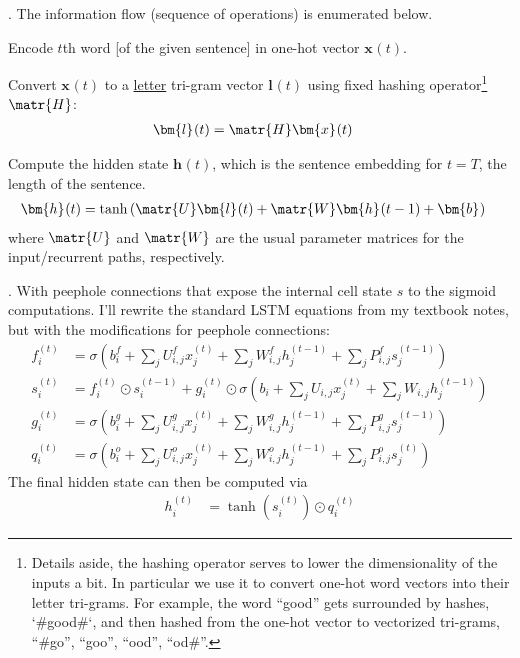 \documentclass[11pt]{article}
\renewcommand\vec[2][]{\bm{#2}_{#1}}
\newcommand\myspace[1][]{\vspace{#1\bigskipamount}}
\newcommand\p{\Needspace{10\baselineskip} \noindent}
\begin{document}
\p {}. The information flow (sequence of operations) is enumerated below.
\begin{compactenum}
	\item Encode $t$th word [of the given sentence] in one-hot vector $\vec{x}(t)$. 
	
	\item Convert $\vec{x}(t)$ to a \underline{letter} tri-gram vector $\vec{l}(t)$ using fixed hashing operator\footnote{Details aside, the hashing operator serves to lower the dimensionality of the inputs a bit. In particular we use it to convert one-hot word vectors into their letter tri-grams. For example, the word ``good'' gets surrounded by hashes, `\#good\#`, and then hashed from the one-hot vector to vectorized tri-grams, ``\#go'', ``goo'', ``ood'', ``od\#''.} $\matr{H}$:
	\begin{align}
		\vec{l}(t) &= \matr{H} \vec{x}(t)
	\end{align}
	
	\item Compute the hidden state $\vec{h}(t)$, which is the sentence embedding for $t = T$, the length of the sentence.
	\begin{align}
		\vec{h}(t) &= \tanh \left(\matr{U} \vec{l}(t) + \matr{W} \vec{h}(t - 1) + \vec{b} \right)
	\end{align}
	where $\matr{U}$ and $\matr{W}$ are the usual parameter matrices for the input/recurrent paths, respectively.
\end{compactenum}

\myspace
\p {}. With peephole connections that expose the internal cell state $s$ to the sigmoid computations. I'll rewrite the standard LSTM equations from my textbook notes, but with the modifications for peephole connections:
\begin{align}
	f_i^{(t)} 
		&= \sigma\left(b_i^f + \sum_j U_{i,j}^f x_j^{(t)} + \sum_j W_{i,j}^f h_j^{(t-1)}
		+  \sum_j P_{i,j}^f s_j^{(t - 1)} \right) \\
	s_i^{(t)} 
		&= f_i^{(t)} \odot s_i^{(t-1)} + g_i^{(t)} \odot \sigma\left(b_i + \sum_j U_{i,j} x_j^{(t)} + \sum_j W_{i,j} h_j^{(t-1)} \right) \\
	g_i^{(t)}
		&= \sigma\left(b_i^g + \sum_j U_{i,j}^g x_j^{(t)} + \sum_j W_{i,j}^g h_j^{(t-1)} 
		+ \sum_j P_{i,j}^g s_j^{(t - 1)} \right) \\
	q_i^{(t)}
		&= \sigma\left(b_i^o + \sum_j U_{i,j}^o x_j^{(t)} + \sum_j W_{i,j}^o h_j^{(t-1)} 
		+ \sum_j P_{i,j}^o s_j^{(t)}\right) 
\end{align}
The final hidden state can then be computed via
\begin{align}
h_i^{(t)} &= \tanh(s_i^{(t)}) \odot q_i^{(t)}
\end{align}
\end{document}
